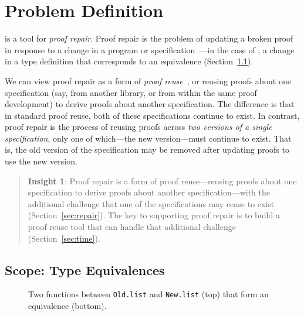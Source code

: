 \section{Problem Definition}
\label{sec:key1}

\toolname is a tool for \textit{proof repair}.
Proof repair is the problem of updating a broken proof in response to a change in a program or specification~\cite{PGL-045, pumpkinpatch}---in the
case of \toolname, a change in a type definition that corresponds to an equivalence (Section~\ref{sec:scope}).

We can view proof repair as a form of 
\textit{proof reuse}~\cite{Ringer2019, felty1994generalization, caplan1995logical, pons2000generalization, johnsen2004theorem}, %
or reusing proofs about one specification (say, from another library, or from within the same proof development)
to derive proofs about another specification.
The difference is that in standard proof reuse, both of these specifications continue to exist.
In contrast, proof repair is the process of reusing proofs across \textit{two versions of a single specification},
only one of which---the new version---must continue to exist.
That is, the old version of the specification may be removed after updating proofs to use the new version.

\begin{quote}
\textbf{Insight 1}:
Proof repair is a form of proof reuse---reusing proofs about one specification to derive proofs about another specification---with 
the additional challenge that one of the specifications may cease to exist (Section~\ref{sec:repair}).
The key to supporting proof repair is to build a proof reuse
tool that can handle that additional challenge (Section~\ref{sec:time}).
\end{quote}

\subsection{Scope: Type Equivalences}
\label{sec:scope}

\begin{figure*}
\vspace{-0.3cm}
\caption{Two functions between \lstinline{Old.list} and \lstinline{New.list} (top) that form an equivalence (bottom).}
\label{fig:equivalence}
\end{figure*}

